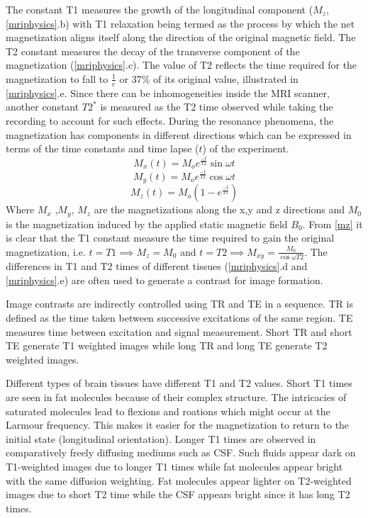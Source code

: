 \documentclass[msthesis.tex]{subfiles}
\begin{document}
The constant T1 measures the growth of the longitudinal component ($M_z$, \cref{mriphysics}.b) with T1 relaxation being termed as the process by which the net magnetization aligns itself along the direction of the original magnetic field. The T2 constant measures the decay of the transverse component of the magnetization (\cref{mriphysics}.c). The value of T2 reflects the time required for the magnetization to fall to $\frac{1}{e}$ or 37\% of its original value, illustrated in \cref{mriphysics}.e. Since there can be inhomogeneities inside the \gls{MRI} scanner, another constant $T2^*$ is measured as the T2 time observed while taking the recording to account for such effects. During the resonance phenomena, the magnetization has components in different directions which can be expressed in terms of the time constants and time lapse ($t$) of the experiment.
\begin{equation}
    M_x(t) = M_o e^{\frac{−t}{T2}} \sin{ \omega t}
    \label{mx}
\end{equation}
\begin{equation}
    M_y(t) = M_o e^{\frac{-t}{T2}} \cos{\omega {t}}
    \label{my}
\end{equation}
\begin{equation}
    M_z(t) = M_o (1 − e^{{\frac{−t}{T1}}})
    \label{mz}
\end{equation}
Where $M_x$ ,$M_y$, $M_z$ are the magnetizations along the x,y and z directions and $M_0$ is the magnetization induced by the applied static magnetic field $B_0$. From \cref{mz} it is clear that the T1 constant measure the time required to gain the original magnetization, i.e. $t=T1 \implies M_z = M_0$ and $t=T2 \implies M_{xy} = \frac{M_0}{\cos{\omega T2}}$. The differences in T1 and T2 times of different tissues (\cref{mriphysics}.d and \cref{mriphysics}.e) are often used to generate a contrast for image formation.

Image contrasts are indirectly controlled using \gls{TR} and \gls{TE} in a sequence. \Gls{TR} is defined as the time taken between successive excitations of the same region. \Gls{TE} measures time between excitation and signal measurement. Short \gls{TR} and short \gls{TE} generate T1 weighted images while long \gls{TR} and long \gls{TE} generate T2 weighted images.

Different types of brain tissues have different T1 and T2 values. Short T1 times are seen in fat molecules because of their complex structure. The intricacies of saturated molecules lead to flexions and roations which might occur at the Larmour frequency. This makes it easier for the magnetization to return to the initial state (longitudinal orientation). Longer T1 times are observed in comparatively freely diffusing mediums such as \gls{CSF}. Such fluids appear dark on T1-weighted images due to longer T1 times while fat molecules appear bright with the same diffusion weighting. Fat molecules appear lighter on T2-weighted images due to short T2 time while the \gls{CSF} appears bright since it has long T2 times.
\end{document}
